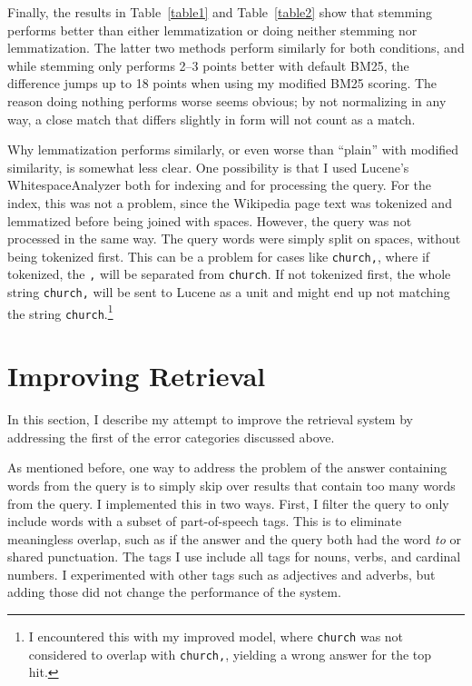 \documentclass[11pt,letterpaper]{article}
\begin{document}
Finally, the results in Table~\ref{table1} and Table~\ref{table2} show that stemming performs better than either lemmatization or doing neither stemming nor lemmatization.
The latter two methods perform similarly for both conditions, and while stemming only performs 2--3 points better with default BM25, the difference jumps up to 18 points when using my modified BM25 scoring.
The reason doing nothing performs worse seems obvious; by not normalizing in any way, a close match that differs slightly in form will not count as a match.


Why lemmatization performs similarly, or even worse than ``plain'' with modified similarity, is somewhat less clear.
One possibility is that I used Lucene's WhitespaceAnalyzer both for indexing and for processing the query.
For the index, this was not a problem, since the Wikipedia page text was tokenized and lemmatized before being joined with spaces.
However, the query was not processed in the same way.
The query words were simply split on spaces, without being tokenized first.
This can be a problem for cases like \texttt{church,}, where if tokenized, the \texttt{,} will be separated from \texttt{church}.
If not tokenized first, the whole string \texttt{church,} will be sent to Lucene as a unit and might end up not matching the string \texttt{church}.\footnote{I encountered this with my improved model, where \texttt{church} was not considered to overlap with \texttt{church,}, yielding a wrong answer for the top hit.}




\section{Improving Retrieval}

In this section, I describe my attempt to improve the retrieval system by addressing the first of the error categories discussed above.

As mentioned before, one way to address the problem of the answer containing words from the query is to simply skip over results that contain too many words from the query.
I implemented this in two ways.
First, I filter the query to only include words with a subset of part-of-speech tags.
This is to eliminate meaningless overlap, such as if the answer and the query both had the word \textit{to} or shared punctuation.
The tags I use include all tags for nouns, verbs, and cardinal numbers.
I experimented with other tags such as adjectives and adverbs, but adding those did not change the performance of the system.
\end{document}
